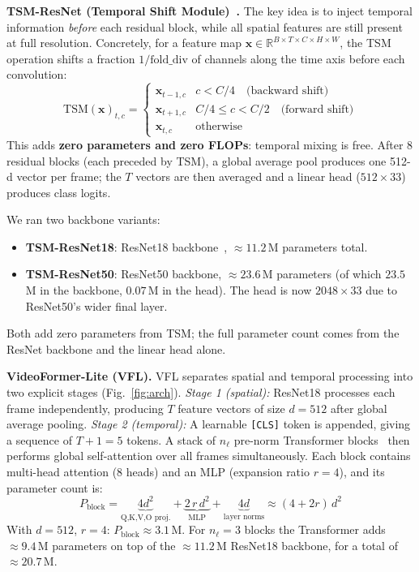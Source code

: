 \documentclass[10pt,twocolumn,letterpaper]{article}
\begin{document}
\noindent\textbf{TSM-ResNet (Temporal Shift Module)~\cite{lin2019tsm}.}
The key idea is to inject temporal information \emph{before} each residual block,
while all spatial features are still present at full resolution.
Concretely, for a feature map $\mathbf{x} \in \mathbb{R}^{B \times T \times C
\times H \times W}$, the TSM operation shifts a fraction $1/\text{fold\_div}$ of
channels along the time axis before each convolution:
\begin{equation}
  \text{TSM}(\mathbf{x})_{t,c} = \begin{cases}
  \mathbf{x}_{t-1,c} & c < C/4 \quad \text{(backward shift)} \\
  \mathbf{x}_{t+1,c} & C/4 \leq c < C/2 \quad \text{(forward shift)} \\
  \mathbf{x}_{t,c}   & \text{otherwise}
  \end{cases}
  \label{eq:tsm}
\end{equation}
This adds \textbf{zero parameters and zero FLOPs}: temporal mixing is free.
After 8 residual blocks (each preceded by TSM), a global average pool produces
one 512-d vector per frame; the $T$ vectors are then averaged and a linear head
($512 \!\times\! 33$) produces class logits.

We ran two backbone variants:
\begin{itemize}
  \item \textbf{TSM-ResNet18}: ResNet18 backbone~\cite{he2016resnet},
        $\approx\!11.2$\,M parameters total.
  \item \textbf{TSM-ResNet50}: ResNet50 backbone, $\approx\!23.6$\,M parameters
        (of which $23.5$\,M in the backbone, $0.07$\,M in the head).
        The head is now $2048 \times 33$ due to ResNet50's wider final layer.
\end{itemize}
Both add zero parameters from TSM; the full parameter count comes from the
ResNet backbone and the linear head alone.

\noindent\textbf{VideoFormer-Lite (VFL).}
VFL separates spatial and temporal processing into two explicit stages
(Fig.~\ref{fig:arch}).
\emph{Stage 1 (spatial):} ResNet18 processes each frame independently, producing
$T$ feature vectors of size $d{=}512$ after global average pooling.
\emph{Stage 2 (temporal):} A learnable \texttt{[CLS]} token is appended, giving a
sequence of $T{+}1{=}5$ tokens. A stack of $n_\ell$ pre-norm Transformer
blocks~\cite{xiong2020prenorm} then performs global self-attention over all frames simultaneously.
Each block contains multi-head attention (8 heads) and an MLP
(expansion ratio $r{=}4$), and its parameter count is:
\begin{equation}
  P_{\text{block}} = \underbrace{4d^2}_{\text{Q,K,V,O proj.}} +
  \underbrace{2\,r\,d^2}_{\text{MLP}} + \underbrace{4d}_{\text{layer norms}}
  \approx (4 + 2r)\,d^2
  \label{eq:vfl_params}
\end{equation}
With $d{=}512$, $r{=}4$: $P_{\text{block}} \approx 3.1$\,M. For $n_\ell{=}3$
blocks the Transformer adds ${\approx}9.4$\,M parameters on top of the
${\approx}11.2$\,M ResNet18 backbone, for a total of ${\approx}20.7$\,M.
\end{document}
